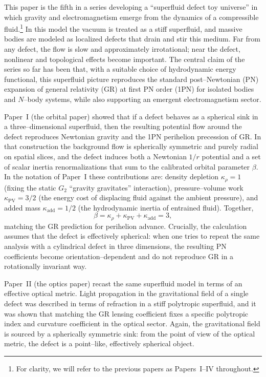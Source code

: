 \documentclass[12pt]{article}
\begin{document}
This paper is the fifth in a series developing a ``superfluid defect toy
universe'' in which gravity and electromagnetism emerge from the dynamics
of a compressible fluid.\footnote{For clarity, we will refer to the previous
papers as Papers~I--IV\cite{Norris:2025Orbits,Norris:Paper2,Norris:Paper3,Norris:Paper4} throughout.}  In this model the vacuum is treated as a
stiff superfluid, and massive bodies are modeled as localized defects that
drain and stir this medium.  Far from any defect, the flow is slow and
approximately irrotational; near the defect, nonlinear and topological
effects become important.  The central claim of the series so far has been
that, with a suitable choice of hydrodynamic energy functional, this
superfluid picture reproduces the standard post–Newtonian (PN) expansion of
general relativity (GR) at first PN order (1PN) for isolated bodies and
$N$--body systems, while also supporting an emergent electromagnetism sector.

Paper~I (the orbital paper) showed that if a defect behaves as a spherical
sink in a three–dimensional superfluid, then the resulting potential flow
around the defect reproduces Newtonian gravity and the 1PN perihelion
precession of GR.  In that construction the background flow is spherically
symmetric and purely radial on spatial slices, and the defect induces both
a Newtonian $1/r$ potential and a set of scalar inertia renormalizations that
sum to the calibrated orbital parameter $\beta$.  In the notation of
Paper~I these contributions are: density depletion $\kappa_{\rho}=1$
(fixing the static $G_2$ ``gravity gravitates'' interaction), pressure--volume
work $\kappa_{\mathrm{PV}}=3/2$ (the energy cost of displacing fluid against
the ambient pressure), and added mass $\kappa_{\mathrm{add}}=1/2$ (the
hydrodynamic inertia of entrained fluid).  Together,
\begin{equation}
  \beta = \kappa_{\rho}+\kappa_{\mathrm{PV}}+\kappa_{\mathrm{add}} = 3,
\end{equation}
matching the GR prediction for perihelion advance.  Crucially, the calculation assumes that
the defect is effectively spherical: when one tries to repeat the same
analysis with a cylindrical defect in three dimensions, the resulting PN
coefficients become orientation–dependent and do not reproduce GR in a
rotationally invariant way.

Paper~II (the optics paper) recast the same superfluid model in terms of an
effective optical metric.  Light propagation in the gravitational field of a
single defect was described in terms of refraction in a stiff polytropic
superfluid, and it was shown that matching the GR lensing coefficient fixes
a specific polytropic index and curvature coefficient in the optical sector.
Again, the gravitational field is sourced by a spherically symmetric sink:
from the point of view of the optical metric, the defect is a point–like,
effectively spherical object.
\end{document}

